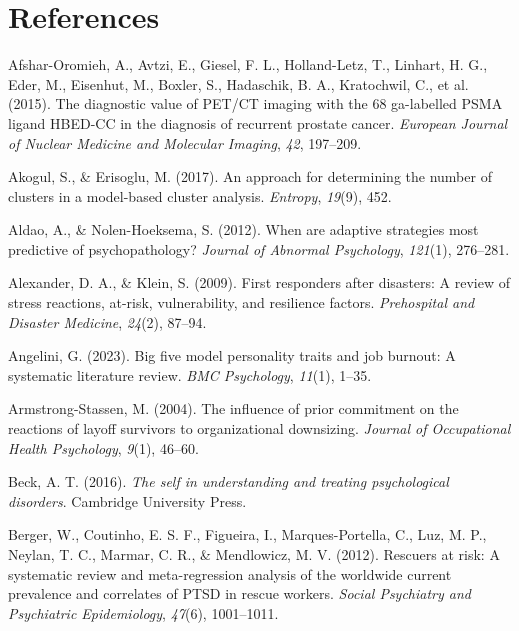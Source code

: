 \documentclass[
  man,floatsintext]{apa7}
\newlength{\cslhangindent}
\newlength{\cslentryspacingunit} %
\newenvironment{CSLReferences}[2] %
 {%
  \setlength{\parindent}{0pt}
  \ifodd #1
  \let\oldpar\par
  \def\par{\hangindent=\cslhangindent\oldpar}
  \fi
  \setlength{\parskip}{#2\cslentryspacingunit}
 }%
 {}
\begin{document}
\newpage

\hypertarget{references}{%
\section{References}\label{references}}

\hypertarget{refs}{}
\begin{CSLReferences}{1}{0}
\leavevmode{}%
Afshar-Oromieh, A., Avtzi, E., Giesel, F. L., Holland-Letz, T., Linhart, H. G., Eder, M., Eisenhut, M., Boxler, S., Hadaschik, B. A., Kratochwil, C., et al. (2015). The diagnostic value of PET/CT imaging with the 68 ga-labelled PSMA ligand HBED-CC in the diagnosis of recurrent prostate cancer. \emph{European Journal of Nuclear Medicine and Molecular Imaging}, \emph{42}, 197--209.

\leavevmode{}%
Akogul, S., \& Erisoglu, M. (2017). An approach for determining the number of clusters in a model-based cluster analysis. \emph{Entropy}, \emph{19}(9), 452.

\leavevmode{}%
Aldao, A., \& Nolen-Hoeksema, S. (2012). When are adaptive strategies most predictive of psychopathology? \emph{Journal of Abnormal Psychology}, \emph{121}(1), 276--281.

\leavevmode{}%
Alexander, D. A., \& Klein, S. (2009). First responders after disasters: A review of stress reactions, at-risk, vulnerability, and resilience factors. \emph{Prehospital and Disaster Medicine}, \emph{24}(2), 87--94.

\leavevmode{}%
Angelini, G. (2023). Big five model personality traits and job burnout: A systematic literature review. \emph{BMC Psychology}, \emph{11}(1), 1--35.

\leavevmode{}%
Armstrong-Stassen, M. (2004). The influence of prior commitment on the reactions of layoff survivors to organizational downsizing. \emph{Journal of Occupational Health Psychology}, \emph{9}(1), 46--60.

\leavevmode{}%
Beck, A. T. (2016). \emph{The self in understanding and treating psychological disorders}. Cambridge University Press.

\leavevmode{}%
Berger, W., Coutinho, E. S. F., Figueira, I., Marques-Portella, C., Luz, M. P., Neylan, T. C., Marmar, C. R., \& Mendlowicz, M. V. (2012). Rescuers at risk: A systematic review and meta-regression analysis of the worldwide current prevalence and correlates of PTSD in rescue workers. \emph{Social Psychiatry and Psychiatric Epidemiology}, \emph{47}(6), 1001--1011.


\end{CSLReferences}
\end{document}
